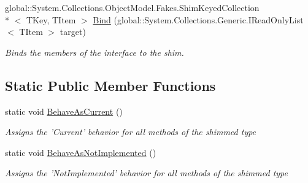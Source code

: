 \begin{DoxyCompactItemize}
global\-::\-System.\-Collections.\-Object\-Model.\-Fakes.\-Shim\-Keyed\-Collection\\*
$<$ T\-Key, T\-Item $>$ \hyperlink{class_system_1_1_collections_1_1_object_model_1_1_fakes_1_1_shim_keyed_collection_3_01_t_key_00_01_t_item_01_4_a6e62d96e791310da39ecf94ec0fa08dc}{Bind} (global\-::\-System.\-Collections.\-Generic.\-I\-Read\-Only\-List$<$ T\-Item $>$ target)
\begin{DoxyCompactList}\small\item\em Binds the members of the interface to the shim.\end{DoxyCompactList}\end{DoxyCompactItemize}
\subsection*{Static Public Member Functions}
\begin{DoxyCompactItemize}
\item 
static void \hyperlink{class_system_1_1_collections_1_1_object_model_1_1_fakes_1_1_shim_keyed_collection_3_01_t_key_00_01_t_item_01_4_ab368557166996efea868399d8ec73473}{Behave\-As\-Current} ()
\begin{DoxyCompactList}\small\item\em Assigns the 'Current' behavior for all methods of the shimmed type\end{DoxyCompactList}\item 
static void \hyperlink{class_system_1_1_collections_1_1_object_model_1_1_fakes_1_1_shim_keyed_collection_3_01_t_key_00_01_t_item_01_4_a87d6478429cfd26e350a3d81449e13d2}{Behave\-As\-Not\-Implemented} ()
\begin{DoxyCompactList}\small\item\em Assigns the 'Not\-Implemented' behavior for all methods of the shimmed type\end{DoxyCompactList}\end{DoxyCompactItemize}
